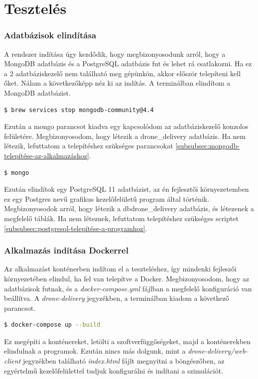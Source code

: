 \section{Tesztelés}
\subsubsection{Adatbázisok elindítása}
A rendszer indítása úgy kezdődik, hogy megbizonyosodunk arról, hogy a MongoDB adatbázis és a PostgreSQL adatbázis fut és lehet rá csatlakozni.
Ha ez a 2 adatbáziskezelő nem található meg gépünkön, akkor először telepíteni kell őket.
Nálam a következőképp néz ki az indítás. A terminálban elindítom a MongoDB adatbázist.
\begin{lstlisting}[language=bash]
  $ brew services stop mongodb-community@4.4
\end{lstlisting}

Ezután a mongo parancsot kiadva egy kapcsolódom az adatbáziskezelő konzolos felületére.
Megbizonyosodom, hogy létezik a drone\_delivery adatbázis.
Ha nem létezik, lefuttatom a telepítéshez szükséges parancsokat \ref{subsubsec:mongodb-telepítése-az-alkalmazáshoz}.
\begin{lstlisting}[language=bash]
  $ mongo
\end{lstlisting}


Ezután elindítok egy PostgreSQL 11 adatbázist, az én fejlesztői környezetemben ez egy Postgres nevű grafikus kezelőfelületű program által történik.
Megbizonyosodok arról, hogy létezik a dbdrone\_delivery adatbázis, és létezenek a megfelelő táblák. Ha nem léteznek, lefuttatom telepítéshez szükséges scriptet \ref{subsubsec:postgresql-telepítése-a-programhoz}.

\subsubsection{Alkalmazás indítása Dockerrel}
Az alkalmazást konténerben indítom el a teszteléshez, így mindenki fejleszői környezetében elindul, ha fel van telepítve a Docker.
Megbizonyosodom, hogy az adatbázisok futnak, és a \textit{docker-compose.yml} fájlban a megfelelő konfiguráció van beállítva.
A \textit{drone-delivery} jegyzékben, a terminálban kiadom a következő parancsot.
\begin{lstlisting}[language=bash]
  $ docker-compose up --build
\end{lstlisting}

Ez megépíti a konténereket, letölti a szoftverfüggőségeket, majd a konténerekben elindulnak a programok.
Ezután nincs más dolgunk, mint a \textit{drone-delivery/web-client} jegyzékben található \textit{index.html} fájlt megnyitni a böngészőben, az egyértelmű kezelőfelülettel tudjuk konfigurálni és indítani a szimulációt.

